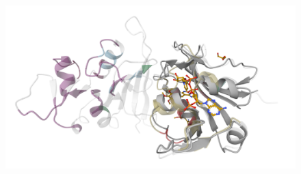\documentclass[aspectratio=169]{beamer}
\begin{document}
\begin{frame}
  \begin{figure}
    \centering
    \includegraphics[width=\linewidth,height=\textheight,keepaspectratio]{fig/screen4.png}
  \end{figure}

\end{frame}

\begin{frame}[plain]
\end{frame}
\end{document}
